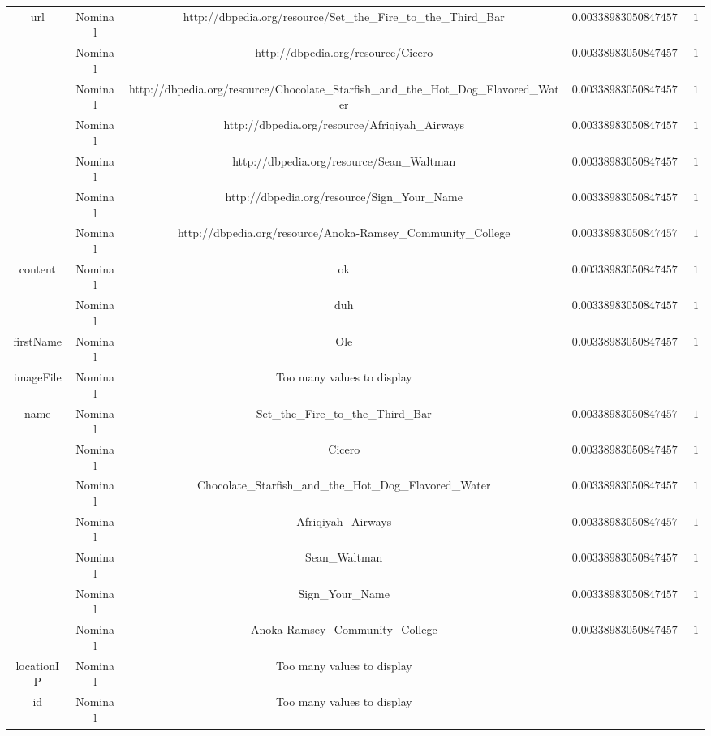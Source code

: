 \begin{tabular}{|c|c|c|c|c|}
\multirow{7}{*}{url} & Nominal & http://dbpedia.org/resource/Set_the_Fire_to_the_Third_Bar & $0.003389830508474576$ & $1$ \\ \cline{2-4} 
 & Nominal & http://dbpedia.org/resource/Cicero & $0.003389830508474576$ & $1$ \\ \cline{2-4} 
 & Nominal & http://dbpedia.org/resource/Chocolate_Starfish_and_the_Hot_Dog_Flavored_Water & $0.003389830508474576$ & $1$ \\ \cline{2-4} 
 & Nominal & http://dbpedia.org/resource/Afriqiyah_Airways & $0.003389830508474576$ & $1$ \\ \cline{2-4} 
 & Nominal & http://dbpedia.org/resource/Sean_Waltman & $0.003389830508474576$ & $1$ \\ \cline{2-4} 
 & Nominal & http://dbpedia.org/resource/Sign_Your_Name & $0.003389830508474576$ & $1$ \\ \cline{2-4} 
 & Nominal & http://dbpedia.org/resource/Anoka-Ramsey_Community_College & $0.003389830508474576$ & $1$ \\ \hline 
\multirow{2}{*}{content} & Nominal & ok & $0.003389830508474576$ & $1$ \\ \cline{2-4} 
 & Nominal & duh & $0.003389830508474576$ & $1$ \\ \hline 
\multirow{1}{*}{firstName} & Nominal & Ole & $0.003389830508474576$ & $1$ \\ \hline 
imageFile & Nominal & Too many values to display & \\ \hline
\multirow{7}{*}{name} & Nominal & Set_the_Fire_to_the_Third_Bar & $0.003389830508474576$ & $1$ \\ \cline{2-4} 
 & Nominal & Cicero & $0.003389830508474576$ & $1$ \\ \cline{2-4} 
 & Nominal & Chocolate_Starfish_and_the_Hot_Dog_Flavored_Water & $0.003389830508474576$ & $1$ \\ \cline{2-4} 
 & Nominal & Afriqiyah_Airways & $0.003389830508474576$ & $1$ \\ \cline{2-4} 
 & Nominal & Sean_Waltman & $0.003389830508474576$ & $1$ \\ \cline{2-4} 
 & Nominal & Sign_Your_Name & $0.003389830508474576$ & $1$ \\ \cline{2-4} 
 & Nominal & Anoka-Ramsey_Community_College & $0.003389830508474576$ & $1$ \\ \hline 
locationIP & Nominal & Too many values to display & \\ \hline
id & Nominal & Too many values to display & \\ \hline
\end{tabular}


